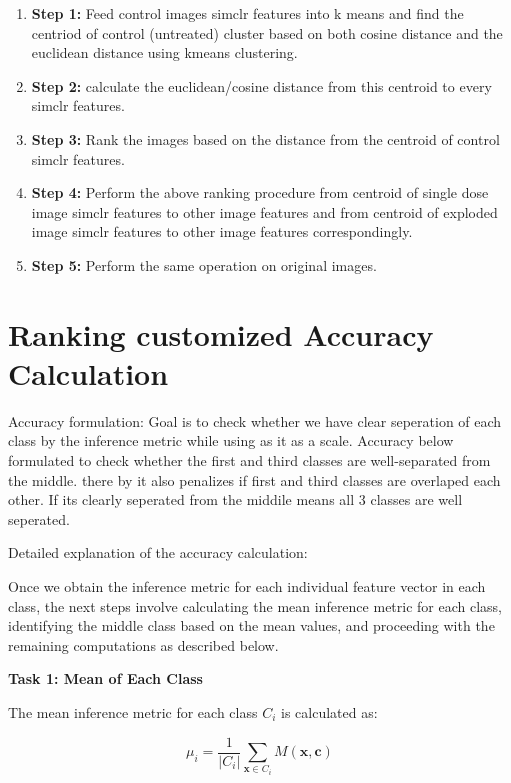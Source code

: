 \begin{enumerate}
  \item \textbf{Step 1:} Feed control images simclr features into k means and find the centriod of control (untreated) cluster based on both cosine distance and the euclidean distance using kmeans clustering. 
 
  
  \item \textbf{Step 2:} calculate the euclidean/cosine distance from this centroid to every simclr features.
  \item \textbf{Step 3:} Rank the images based on the distance from the centroid of control simclr features.
  \item \textbf{Step 4:} Perform the above ranking procedure from centroid of single dose image simclr features to other image features and from centroid of exploded image simclr features to other image features correspondingly.
  
  \item \textbf{Step 5:} Perform the same operation  on original images.
\end{enumerate}


\section*{Ranking customized Accuracy Calculation}

Accuracy formulation: Goal is to check whether we have clear seperation of each class by the inference metric while using as it as a scale. Accuracy below formulated to check whether the first and third classes are well-separated from the middle. there by it also penalizes if first and third classes are overlaped each other. If its clearly seperated from the middile means all 3 classes  are well seperated. 

Detailed explanation of the accuracy calculation:

Once we obtain the inference metric for each individual feature vector in each class, the next steps involve calculating the mean inference metric for each class, identifying the middle class based on the mean values, and proceeding with the remaining computations as described below.

\textbf{Task 1: Mean of Each Class}

The mean inference metric for each class \( C_i \) is calculated as:

\[
\mu_i = \frac{1}{|C_i|} \sum_{\mathbf{x} \in C_i} M(\mathbf{x}, \mathbf{c})
\]

